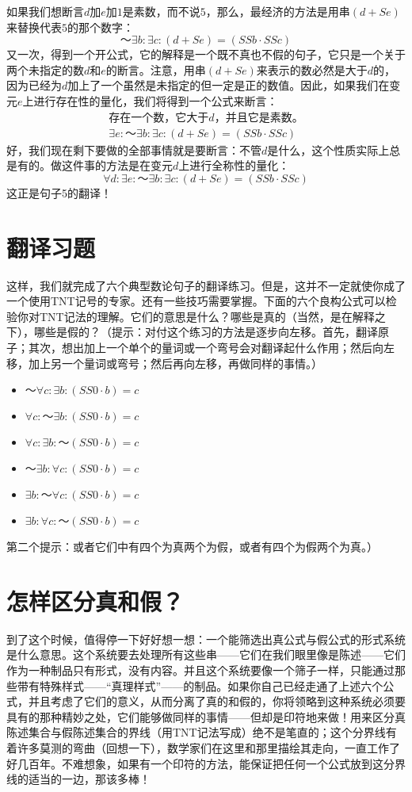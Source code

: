 如果我们想断言$d$加$e$加$1$是素数，而不说$5$，那么，最经济的方法是用串$(d+Se)$来替换代表$5$的那个数字：
\[
～\exists b:\exists c:(d+Se)=(SSb\cdot SSc)
\]
又一次，得到一个开公式，它的解释是一个既不真也不假的句子，它只是一个关于两个未指定的数$d$和$e$的断言。注意，用串$(d+Se)$来表示的数必然是大于$d$的，因为已经为$d$加上了一个虽然是未指定的但一定是正的数值。因此，如果我们在变元$e$上进行存在性的量化，我们将得到一个公式来断言：
\begin{gather*}
\text{存在一个数，它大于$d$，并且它是素数。}\\
\exists e:～\exists b:\exists c:(d+Se)=(SSb\cdot SSc)
\end{gather*}
好，我们现在剩下要做的全部事情就是要断言：不管$d$是什么，这个性质实际上总是有的。做这件事的方法是在变元$d$上进行全称性的量化：
\[
\forall d:\exists e:～\exists b:\exists c:(d+Se)=(SSb\cdot SSc)
\]
这正是句子5的翻译！

\section{翻译习题}

这样，我们就完成了六个典型数论句子的翻译练习。但是，这并不一定就使你成了一个使用TNT记号的专家。还有一些技巧需要掌握。下面的六个良构公式可以检验你对TNT记法的理解。它们的意思是什么？哪些是真的（当然，是在解释之下），哪些是假的？（提示：对付这个练习的方法是逐步向左移。首先，翻译原子；其次，想出加上一个单个的量词或一个弯号会对翻译起什么作用；然后向左移，加上另一个量词或弯号；然后再向左移，再做同样的事情。）
\begin{itemize}
\item $～\forall c:\exists b:(SS0\cdot b)=c$
\item $\forall c:～\exists b:(SS0\cdot b)=c$
\item $\forall c:\exists b:～(SS0\cdot b)=c$
\item $～\exists b:\forall c:(SS0\cdot b)=c$
\item $\exists b:～\forall c:(SS0\cdot b)=c$
\item $\exists b:\forall c:～(SS0\cdot b)=c$
\end{itemize}
第二个提示：或者它们中有四个为真两个为假，或者有四个为假两个为真。）

\section{怎样区分真和假？}

到了这个时候，值得停一下好好想一想：一个能筛选出真公式与假公式的形式系统是什么意思。这个系统要去处理所有这些串——它们在我们眼里像是陈述——它们作为一种制品只有形式，没有内容。并且这个系统要像一个筛子一样，只能通过那些带有特殊样式——“真理样式”——的制品。如果你自己已经走通了上述六个公式，并且考虑了它们的意义，从而分离了真的和假的，你将领略到这种系统必须要具有的那种精妙之处，它们能够做同样的事情——但却是印符地来做！用来区分真陈述集合与假陈述集合的界线（用TNT记法写成）绝不是笔直的；这个分界线有着许多莫测的弯曲（回想一下），数学家们在这里和那里描绘其走向，一直工作了好几百年。不难想象，如果有一个印符的方法，能保证把任何一个公式放到这分界线的适当的一边，那该多棒！

